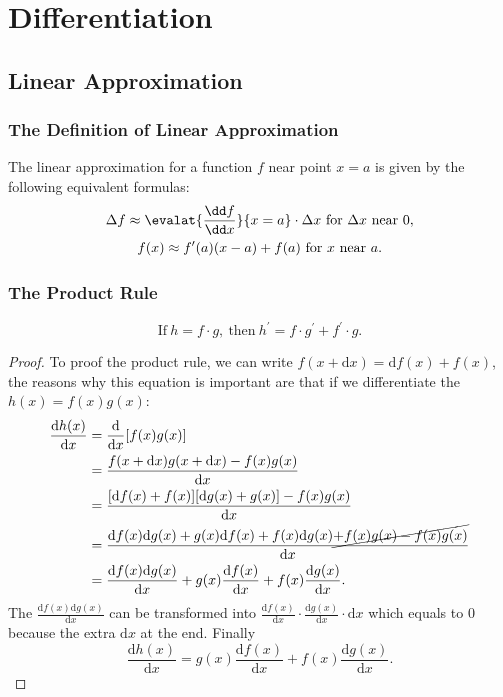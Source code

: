 \chapter{Differentiation}
\section{Linear Approximation}
\subsection{The Definition of Linear Approximation}
The linear approximation for a function $f$ near point $x=a$ is given by the following equivalent formulas:
\begin{gather*}
  \Delta f\approx\evalat{\frac{\dd f}{\dd x}}{x=a}\cdot\Delta x\ \text{for}\ \Delta x\ \text{near}\ 0,\\
  f(x)\approx f^\prime(a)(x-a)+f(a)\ \text{for}\ x\ \text{near}\ a.
\end{gather*}

\subsection{The Product Rule}
\[\text{If}\ h=f\cdot g,\ \text{then}\ h^\prime=f\cdot g^\prime+f^\prime\cdot g.\]
\begin{proof}
  To proof the product rule, we can write \(f(x+\mathrm{d}x)=\mathrm{d}f(x)+f(x)\), the reasons why this equation is important are that if we differentiate the \(h(x)=f(x)g(x)\):
    \begin{align*}
        \frac{\mathrm{d}h(x)}{\mathrm{d}x} & =\frac{\mathrm{d}}{\mathrm{d}x}[f(x)g(x)]\\
                                           & =\frac{f(x+\mathrm{d}x)g(x+\mathrm{d}x)-f(x)g(x)}{\mathrm{d}x}\\
                                           & =\frac{[\mathrm{d}f(x)+f(x)][\mathrm{d}g(x)+g(x)]-f(x)g(x)}{\mathrm{d}x}\\
                                           & =\frac{\mathrm{d}f(x)\mathrm{d}g(x)+g(x)\mathrm{d}f(x)+f(x)\mathrm{d}g(x)\cancel{+f(x)g(x)-f(x)g(x)}}{\mathrm{d}x}\\
                                           & =\frac{\mathrm{d}f(x)\mathrm{d}g(x)}{\mathrm{d}x}+g(x)\frac{\mathrm{d}f(x)}{\mathrm{d}x}+f(x)\frac{\mathrm{d}g(x)}{\mathrm{d}x}.
    \end{align*}
    The \(\frac{\mathrm{d}f(x)\mathrm{d}g(x)}{\mathrm{d}x}\) can be transformed into \(\frac{\mathrm{d}f(x)}{\mathrm{d}x}\cdot\frac{\mathrm{d}g(x)}{\mathrm{d}x}\cdot\mathrm{d}x\) which equals to \(0\) because the extra \(\mathrm{d}x\) at the end. Finally
    \[
        \frac{\mathrm{d}h(x)}{\mathrm{d}x}=g(x)\frac{\mathrm{d}f(x)}{\mathrm{d}x}+f(x)\frac{\mathrm{d}g(x)}{\mathrm{d}x}.
    \]
\end{proof}

